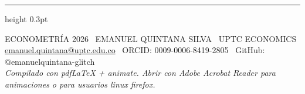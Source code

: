 \documentclass[9pt, spanish, twoside]{article}
\newcommand{\techfont}{\fontfamily{phv}\selectfont}
\begin{document}
\vfill
\hrule height 0.3pt
\vspace{3pt}
\begin{center}
    \scriptsize\techfont\lsstyle
    \textcolor{VogueBlack}{ECONOMETRÍA 2026} \textbar\
    \textcolor{Champagne}{EMANUEL QUINTANA SILVA} \textbar\
    UPTC ECONOMICS \\
    \vspace{2pt}
    \textcolor{InkGray}{\href{mailto:emanuel.quintana@uptc.edu.co}{emanuel.quintana@uptc.edu.co} \textbar\ ORCID: 0009-0006-8419-2805 \textbar\ GitHub: @emanuelquintana-glitch} \\
    \vspace{2pt}
    \textit{Compilado con pdfLaTeX + animate. Abrir con Adobe Acrobat Reader para animaciones o para usuarios linux firefox.}
\end{center}
\end{document}
